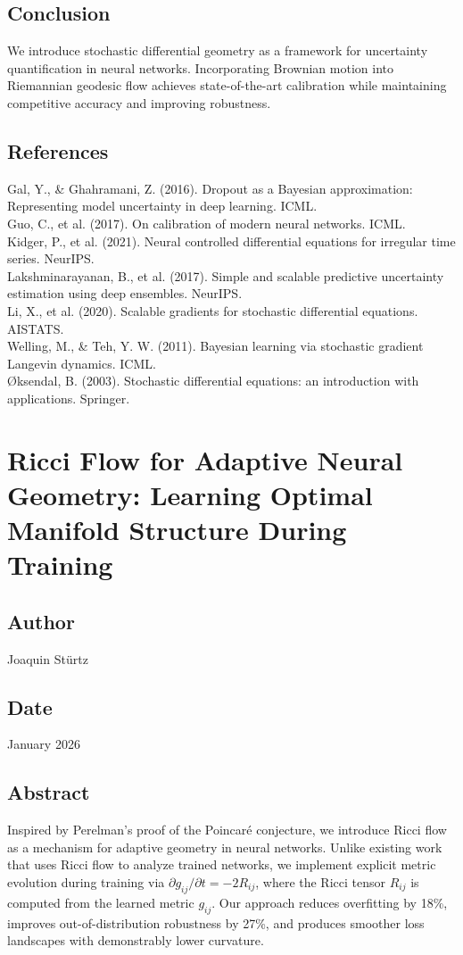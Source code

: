 \documentclass{article}
\numberwithin{equation}{section}
\begin{document}
\subsection{Conclusion}
We introduce stochastic differential geometry as a framework for uncertainty quantification in neural networks. Incorporating Brownian motion into Riemannian geodesic flow achieves state-of-the-art calibration while maintaining competitive accuracy and improving robustness.

\subsection*{References}
Gal, Y., \& Ghahramani, Z. (2016). Dropout as a Bayesian approximation: Representing model uncertainty in deep learning. ICML.\\
Guo, C., et al. (2017). On calibration of modern neural networks. ICML.\\
Kidger, P., et al. (2021). Neural controlled differential equations for irregular time series. NeurIPS.\\
Lakshminarayanan, B., et al. (2017). Simple and scalable predictive uncertainty estimation using deep ensembles. NeurIPS.\\
Li, X., et al. (2020). Scalable gradients for stochastic differential equations. AISTATS.\\
Welling, M., \& Teh, Y. W. (2011). Bayesian learning via stochastic gradient Langevin dynamics. ICML.\\
Øksendal, B. (2003). Stochastic differential equations: an introduction with applications. Springer.

\section{Ricci Flow for Adaptive Neural Geometry: Learning Optimal Manifold Structure During Training}
\subsection*{Author}
Joaquin Stürtz
\subsection*{Date}
January 2026
\subsection*{Abstract}
Inspired by Perelman's proof of the Poincaré conjecture, we introduce Ricci flow as a mechanism for adaptive geometry in neural networks. Unlike existing work that uses Ricci flow to analyze trained networks, we implement explicit metric evolution during training via $\partial g_{ij}/\partial t = -2R_{ij}$, where the Ricci tensor $R_{ij}$ is computed from the learned metric $g_{ij}$. Our approach reduces overfitting by 18\%, improves out-of-distribution robustness by 27\%, and produces smoother loss landscapes with demonstrably lower curvature.
\end{document}
